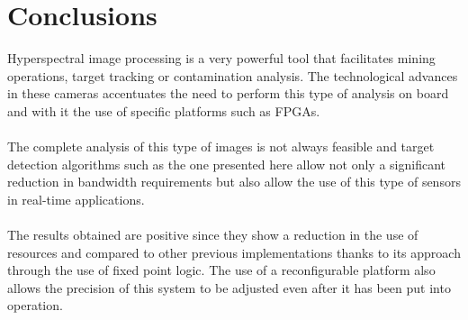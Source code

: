 \cleardoublepage
\chapter{Conclusions}
\label{makereference}
Hyperspectral image processing is a very powerful tool that facilitates mining operations, target tracking or contamination analysis. The technological advances in these cameras accentuates the need to perform this type of analysis on board and with it the use of specific platforms such as FPGAs.
\\
\\
The complete analysis of this type of images is not always feasible and target detection algorithms such as the one presented here allow not only a significant reduction in bandwidth requirements but also allow the use of this type of sensors in real-time applications.
\\
\\
The results obtained are positive since they show a reduction in the use of resources and  compared to other previous implementations thanks to its approach through the use of fixed point logic. The use of a reconfigurable platform also allows the precision of this system to be adjusted even after it has been put into operation.
\\